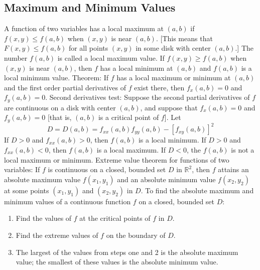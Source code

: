 \documentclass{article}
\begin{document}
    \subsection{Maximum and Minimum Values}
    \begin{outline}
        \1 A function of two variables has a local maximum at \((a,b)\) if \(f(x,y)\leq f(a,b)\) when \((x,y)\) is near \((a,b)\). [This means that \(F(x,y)\leq f(a,b)\) for all points \((x,y)\) in some disk with center \((a,b)\).] The number \(f(a,b)\) is called a local maximum value. If \(f(x,y)\geq f(a,b)\) when \((x,y)\) is near \((a,b)\), then $f$ has a local minimum at \((a,b)\) and \(f(a,b)\) is a local minimum value. 
        \1 Theorem: If $f$ has a local maximum or minimum at \((a,b)\) and the first order partial derivatives of $f$ exist there, then \(f_x(a,b)=0\) and \(f_y(a,b)=0\). 
        \1 Second derivatives test: Suppose the second partial derivatives of $f$ are continuous on a disk with center \((a,b)\), and suppose that \(f_x(a,b)=0\) and \(f_y(a,b)=0\) [that is, \((a,b)\) is a critical point of $f$]. Let \[D=D(a,b)=f_{xx}(a,b)f_{yy}(a,b)-[f_{xy}(a,b)]^2\]
            \2 If \(D>0\) and \(f_{xx}(a,b)>0\), then \(f(a,b)\) is a local minimum. 
            \2 If \(D>0\) and \(f_{xx}(a,b)<0\), then \(f(a,b)\) is a local maximum. 
            \2 If \(D<0\), the \(f(a,b)\) is not a local maximum or minimum. 
        \1 Extreme value theorem for functions of two variables: If $f$ is continuous on a closed, bounded set $D$ in \(\mathbb{R}^2\), then $f$ attains an absolute maximum value \(f(x_1,y_1)\) and an absolute minimum value \(f(x_2,y_2)\) at some points \((x_1,y_1)\) and \((x_2,y_2)\) in $D$. 
        \1 To find the absolute maximum and minimum values of a continuous function $f$ on a closed, bounded set $D$:
    \0 
        \begin{enumerate}
            \item Find the values of $f$ at the critical points of $f$ in $D$. 
            \item Find the extreme values of $f$ on the boundary of $D$. 
            \item The largest of the values from steps one and 2 is the absolute maximum value; the smallest of these values is the absolute minimum value. 
        \end{enumerate}

    \end{outline}
\end{document}
